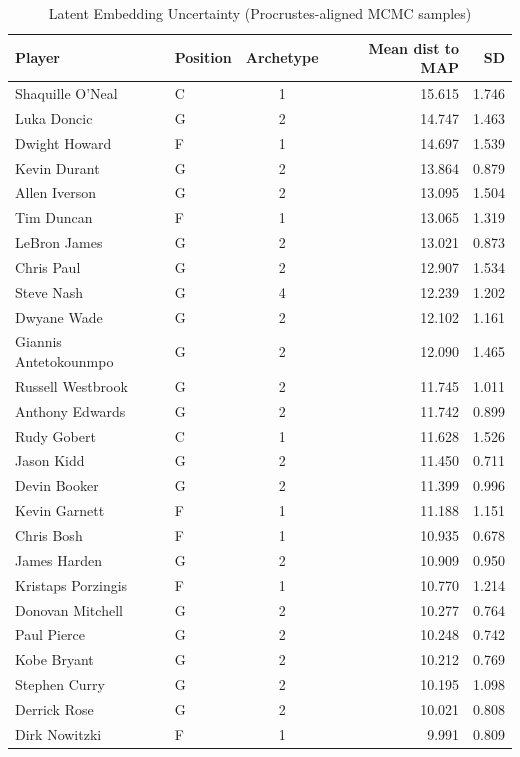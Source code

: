 \begin{table}[t]
\caption*{
{\fontsize{20}{25}\selectfont  Latent Embedding Uncertainty (Procrustes-aligned MCMC samples)\fontsize{12}{15}\selectfont }
} 
\fontsize{12.0pt}{14.0pt}\selectfont
\begin{tabular*}{\linewidth}{@{\extracolsep{\fill}}llcrr}
\toprule
Player & Position & Archetype & Mean dist to MAP & SD \\ 
\midrule\addlinespace[2.5pt]
Shaquille O'Neal & C & 1 & 15.615 & 1.746 \\ 
Luka Doncic & G & 2 & 14.747 & 1.463 \\ 
Dwight Howard & F & 1 & 14.697 & 1.539 \\ 
Kevin Durant & G & 2 & 13.864 & 0.879 \\ 
Allen Iverson & G & 2 & 13.095 & 1.504 \\ 
Tim Duncan & F & 1 & 13.065 & 1.319 \\ 
LeBron James & G & 2 & 13.021 & 0.873 \\ 
Chris Paul & G & 2 & 12.907 & 1.534 \\ 
Steve Nash & G & 4 & 12.239 & 1.202 \\ 
Dwyane Wade & G & 2 & 12.102 & 1.161 \\ 
Giannis Antetokounmpo & G & 2 & 12.090 & 1.465 \\ 
Russell Westbrook & G & 2 & 11.745 & 1.011 \\ 
Anthony Edwards & G & 2 & 11.742 & 0.899 \\ 
Rudy Gobert & C & 1 & 11.628 & 1.526 \\ 
Jason Kidd & G & 2 & 11.450 & 0.711 \\ 
Devin Booker & G & 2 & 11.399 & 0.996 \\ 
Kevin Garnett & F & 1 & 11.188 & 1.151 \\ 
Chris Bosh & F & 1 & 10.935 & 0.678 \\ 
James Harden & G & 2 & 10.909 & 0.950 \\ 
Kristaps Porzingis & F & 1 & 10.770 & 1.214 \\ 
Donovan Mitchell & G & 2 & 10.277 & 0.764 \\ 
Paul Pierce & G & 2 & 10.248 & 0.742 \\ 
Kobe Bryant & G & 2 & 10.212 & 0.769 \\ 
Stephen Curry & G & 2 & 10.195 & 1.098 \\ 
Derrick Rose & G & 2 & 10.021 & 0.808 \\ 
Dirk Nowitzki & F & 1 & 9.991 & 0.809 \\ 

\end{tabular*}
\end{table}
